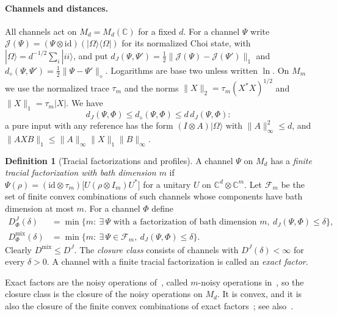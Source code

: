 \documentclass[11pt,a4paper]{article}
\theoremstyle{plain}
\theoremstyle{definition}
\newtheorem{definition}[theorem]{Definition}
\theoremstyle{remark}
\newcommand{\Dmix}{D^{\mathrm{mix}}}
\newcommand{\DChoi}{D^{J}}
\newcommand{\dJ}{d_J}
\newcommand{\ddia}{d_\diamond}
\begin{document}
\paragraph{Channels and distances.} All channels act on $M_d=M_d(\mathbb{C})$ for a fixed $d$. For a channel
$\Psi$ write $\mathcal{J}(\Psi)=(\Psi\otimes\mathrm{id})(|\Omega\rangle\langle\Omega|)$ for its normalized Choi
state, with $|\Omega\rangle=d^{-1/2}\sum_i|ii\rangle$, and put
$\dJ(\Psi,\Psi')=\tfrac12\|\mathcal{J}(\Psi)-\mathcal{J}(\Psi')\|_1$ and $\ddia(\Psi,\Psi')=\tfrac12\|\Psi-\Psi'\|_\diamond$.
Logarithms are base two unless written $\ln$. On $M_m$ we use the normalized trace $\tau_m$ and the norms
$\|X\|_{2}=\tau_m(X^*X)^{1/2}$ and $\|X\|_{1}=\tau_m|X|$. We have
\begin{equation}\label{eq:dJ-ddia}
\dJ(\Psi,\Phi)\le\ddia(\Psi,\Phi)\le d\,\dJ(\Psi,\Phi):
\end{equation}
a pure input with any reference has the form $(I\otimes A)|\Omega\rangle$ with $\|A\|_\infty^2\le d$, and
$\|AXB\|_1\le\|A\|_\infty\|X\|_1\|B\|_\infty$.

\begin{definition}[Tracial factorizations and profiles]\label{def:profile}
A channel $\Psi$ on $M_d$ has a \emph{finite tracial factorization with bath dimension $m$} if
$\Psi(\rho)=(\mathrm{id}\otimes\tau_m)\big[U(\rho\otimes I_m)U^*\big]$ for a unitary $U$ on
$\mathbb{C}^d\otimes\mathbb{C}^m$. Let $\mathcal{F}_m$ be the set of finite convex combinations of such channels whose
components have bath dimension at most $m$. For a channel $\Phi$ define
\begin{align*}
\DChoi_\Phi(\delta)&=\min\{m:\ \exists\,\Psi \text{ with a factorization of bath dimension }m,\ \dJ(\Psi,\Phi)\le\delta\},\\
\Dmix_\Phi(\delta)&=\min\{m:\ \exists\,\Psi\in\mathcal{F}_m,\ \dJ(\Psi,\Phi)\le\delta\}.
\end{align*}
Clearly $\Dmix\le\DChoi$. The \emph{closure class} consists of channels with $\DChoi(\delta)<\infty$ for every
$\delta>0$. A channel with a finite tracial factorization is called an \emph{exact factor}.
\end{definition}

Exact factors are the noisy operations of~\cite{HHO2003}, called $m$-noisy operations in~\cite{MullerHermesPerry2019}, so the closure class is
the closure of the noisy operations on $M_d$. It is convex, and it is also the closure of the finite convex combinations of exact
factors~\cite[Proposition~3.8]{Musat2025}; see also~\cite{HaagerupMusat2015}.
\end{document}
